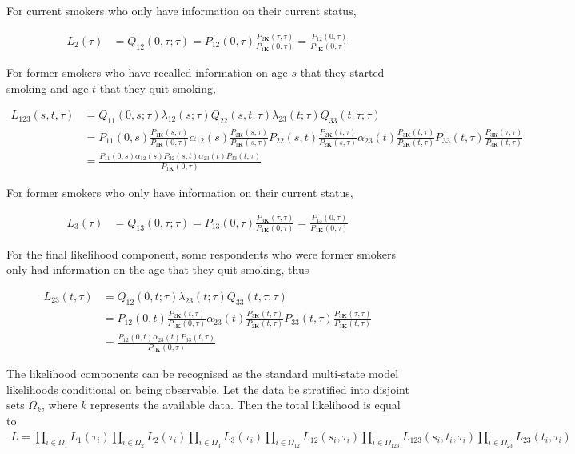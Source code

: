 \documentclass[11pt,a4paper]{article}
\newcommand{\K}{\ensuremath{\bm{K}}}
\begin{document}
For current smokers who only have information on their current status, 

\begin{align*}
L_2(\tau) & = Q_{12}(0,\tau;\tau)  = P_{12}(0,\tau)\frac{P_{2\K}(\tau,\tau)}{P_{1\K}(0,\tau)} 
= \frac{P_{12}(0,\tau)}{P_{1\K}(0,\tau)}  
\end{align*}

For former smokers who have recalled information on age $s$ that they started smoking and age $t$ that they quit smoking,

\begin{align*}
L_{123}(s,t,\tau) & = Q_{11}(0,s;\tau) \lambda_{12}(s;\tau) Q_{22}(s,t;\tau) \lambda_{23}(t;\tau) Q_{33}(t,\tau;\tau) \\
& = P_{11}(0,s)\frac{P_{1\K}(s,\tau)}{P_{1\K}(0,\tau)} 
\alpha_{12}(s) \frac{P_{2\K}(s,\tau)}{P_{1\K}(s,\tau)}
P_{22}(s,t)\frac{P_{2\K}(t,\tau)}{P_{2\K}(s,\tau)}
\alpha_{23}(t) \frac{P_{3\K}(t,\tau)}{P_{2\K}(t,\tau)}
P_{33}(t,\tau)\frac{P_{3\K}(\tau,\tau)}{P_{3\K}(t,\tau)} \\
& = \frac{P_{11}(0,s) \alpha_{12}(s) P_{22}(s,t) \alpha_{23}(t) P_{33}(t,\tau)}{P_{1\K}(0,\tau)}
\end{align*}

For former smokers who only have information on their current status, 

\begin{align*}
L_3(\tau) & = Q_{13}(0,\tau;\tau)  = P_{13}(0,\tau)\frac{P_{3\K}(\tau,\tau)}{P_{1\K}(0,\tau)} 
= \frac{P_{13}(0,\tau)}{P_{1\K}(0,\tau)}  
\end{align*}

For the final likelihood component, some respondents who were former smokers only had information on the age that they quit smoking, thus
 
\begin{align*}
L_{23}(t,\tau) & = Q_{12}(0,t;\tau) \lambda_{23}(t;\tau) Q_{33}(t,\tau;\tau) \\
& = P_{12}(0,t)\frac{P_{2\K}(t,\tau)}{P_{1\K}(0,\tau)} 
\alpha_{23}(t) \frac{P_{3\K}(t,\tau)}{P_{2\K}(t,\tau)}
P_{33}(t,\tau)\frac{P_{3\K}(\tau,\tau)}{P_{3\K}(t,\tau)} \\
& = \frac{P_{12}(0,t) \alpha_{23}(t) P_{33}(t,\tau)}{P_{1\K}(0,\tau)}
\end{align*}

The likelihood components can be recognised as the standard
multi-state model likelihoods conditional on being observable.  Let the data
be stratified into disjoint sets $\Omega_k$, where $k$ represents the
available data. Then the total likelihood is equal to
\begin{align*}
  L = 
\prod_{i \in \Omega_1} L_1(\tau_i)  
\prod_{i \in \Omega_2} L_2(\tau_i)  
\prod_{i \in \Omega_3} L_3(\tau_i)  
\prod_{i \in \Omega_{12}} L_{12}(s_i,\tau_i)  
\prod_{i \in \Omega_{123}} L_{123}(s_i,t_i,\tau_i)  
\prod_{i \in \Omega_{23}} L_{23}(t_i,\tau_i)  
\end{align*}
\end{document}
